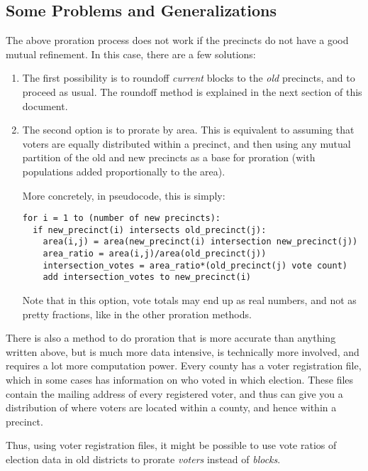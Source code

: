 \subsection{Some Problems and Generalizations}
The above proration process does not work if the precincts 
do not have a good mutual refinement. In this case, there are 
a few solutions:
\begin{enumerate}
  \item The first possibility is to roundoff 
    {\it current} blocks to the {\it old} precincts, and 
    to proceed as usual. The roundoff method is explained in the 
    next section of this document.
  \item The second option is to prorate by area. This is 
    equivalent to assuming that voters are equally 
    distributed within a precinct, and then using any 
    mutual partition of the old and new precincts as a 
    base for proration (with populations added proportionally 
    to the area). 

    More concretely, in pseudocode, this is simply:
    \begin{verbatim}
for i = 1 to (number of new precincts):
  if new_precinct(i) intersects old_precinct(j):
    area(i,j) = area(new_precinct(i) intersection new_precinct(j))
    area_ratio = area(i,j)/area(old_precinct(j))
    intersection_votes = area_ratio*(old_precinct(j) vote count)
    add intersection_votes to new_precinct(i)
    \end{verbatim}
    Note that in this option, vote totals may end up as real 
    numbers, and not as pretty fractions, like in the other proration 
    methods. 
\end{enumerate}
There is also a method to do proration that is more accurate than 
anything written above, but is much more data intensive, is technically 
more involved, and requires a lot more computation power. Every 
county has a voter registration file, which in some cases has 
information on who voted in which election. These files contain the 
mailing address of every registered voter, and thus can give you a 
distribution of where voters are located within a county, and hence 
within a precinct.

Thus, using voter registration files, it might be possible to 
use vote ratios of election data in old districts to prorate 
{\it voters} instead of {\it blocks}.
